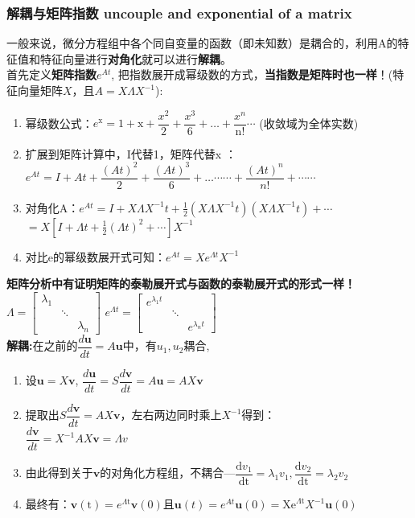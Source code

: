 \documentclass[UTF8]{article}
\begin{document}
    \subsubsection{解耦与矩阵指数 uncouple and exponential of a matrix}
    一般来说，微分方程组中各个同自变量的函数（即未知数）是耦合的，利用A的特征值和特征向量进行\textbf{对角化}就可以进行\textbf{解耦}。
    \\
    首先定义\textbf{矩阵指数$e^{A t}$}, 把指数展开成幂级数的方式，\textbf{当指数是矩阵时也一样}！(特征向量矩阵$X$，且$A=X\Lambda X^{-1}$):
    \begin{enumerate}
        \item 幂级数公式：$e^{\mathrm{x}}=1+\mathrm{x}+\dfrac{x^{2}}{2}+\dfrac{x^{3}}{6}+ \dots +\dfrac{x^{n}}{\mathrm{n} !}\cdots$ \quad (收敛域为全体实数)
        \item 扩展到矩阵计算中，I代替1，矩阵代替x ：\\
        $e^{A t}=I+A t+\dfrac{(A t)^{2}}{2}+\dfrac{(A t)^{3}}{6}+\dots \cdots \cdots+\dfrac{(A t)^{n}}{n !}+\cdots \cdots$
        \item 对角化A：$e^{A t}=I+X \Lambda X^{-1} t+\frac{1}{2}\left(X \Lambda X^{-1} t\right)\left(X \Lambda X^{-1} t\right)+\cdots$\\
        $=X\left[I+\Lambda t+\frac{1}{2}(\Lambda t)^{2}+\cdots\right] X^{-1}$
        \item 对比e的幂级数展开式可知：$e^{A t}=X e^{\Lambda t} X^{-1}$
    \end{enumerate}
    \textbf{矩阵分析中有证明矩阵的泰勒展开式与函数的泰勒展开式的形式一样！}\\
    $\Lambda=\left[\begin{array}{ccc}{\lambda_{1}} & {} & {} \\ {} & {\ddots} & {} \\ {} & {} & {\lambda_{n}}\end{array}\right]$ \quad
    $e^{\Lambda t} = \left[\begin{array}{ccc}{e^{\lambda_{1} t}} & {} & {} \\ {} & {\ddots} & {} \\ {} & {} & {e^{\lambda_{n} t}}\end{array}\right]$
    \\
    \textbf{解耦:}在之前的$\dfrac{d\bm{u}}{dt}=A\bm{u}$中，有$u_1, u_2$耦合,
    \begin{enumerate}
        \item 设$\bm{u}=X\bm{v}$, $\dfrac{{d} \bm{u}}{dt}={S} \dfrac{{d} \bm{v}}{{dt}}=A\bm{u}=AX\bm{v}$
        \item 提取出${S} \dfrac{{d} \bm{v}}{{dt}}=AX\bm{v}$，左右两边同时乘上$X^{-1}$得到：\\
        $\dfrac{{d} \bm{v}}{{dt}}=X^{-1}AX\bm{v} = \Lambda v$
        \item 由此得到关于$\bm{v}$的对角化方程组，不耦合---$\dfrac{\mathrm{d} v_{1}}{\mathrm{dt}}=\lambda_{1} v_{1}, \dfrac{\mathrm{d} v_{2}}{\mathrm{dt}}=\lambda_{2} v_{2}$
        \item 最终有：$\bm{v}(\mathrm{t})=e^{\Lambda \mathrm{t}} \bm{v}(0)$且$\bm{u}(t)=e^{A t} \bm{u}(0)=\mathrm{Xe}^{\Lambda \mathrm{t}} X^{-1} \bm{u}(0)$
    \end{enumerate}
\end{document}
